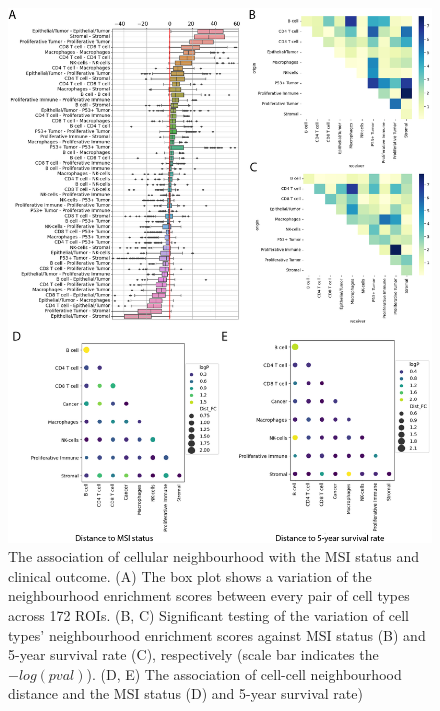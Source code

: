 \begin{figure}
    \centering
    \includegraphics[width=\columnwidth]{Chapter4/Figures/Chapt4_figure4_IMC_sig_test.png}
    \caption[The association of cellular neighbourhood with the MSI status and clinical outcome]{The association of cellular neighbourhood with the MSI status and clinical outcome. (A) The box plot shows a variation of the neighbourhood enrichment scores between every pair of cell types across 172 ROIs. (B, C) Significant testing of the variation of cell types' neighbourhood enrichment scores against MSI status (B) and 5-year survival rate (C), respectively (scale bar indicates the $-log(pval)$). (D, E) The association of cell-cell neighbourhood distance and the MSI status (D) and 5-year survival rate)}
    \label{Chap4:fig_IMC_res2}
    
\end{figure} 

